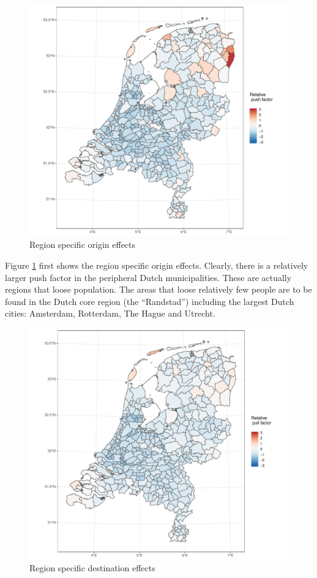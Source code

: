 \documentclass[fleqn,10pt]{SelfArx} %
\begin{document}
{{\begin{figure}
		\centering
		\includegraphics[width = \columnwidth]{../fig/p_coef_out.pdf}
		\caption{Region specific origin effects}\label{fig:out}
\end{figure}

Figure \ref{fig:out} first shows the region specific origin effects. Clearly, there is a relatively larger push factor in the peripheral Dutch municipalities. These are actually regions that loose population. The areas that loose relatively few people are to be found in the Dutch core region (the ``Randstad'') including the largest Dutch cities: Amsterdam, Rotterdam, The Hague and Utrecht.  

\begin{figure}
	\centering
	\includegraphics[width = \columnwidth]{../fig/p_coef_in.pdf}
	\caption{Region specific destination effects}\label{fig:in}
\end{figure}

}}
\end{document}
